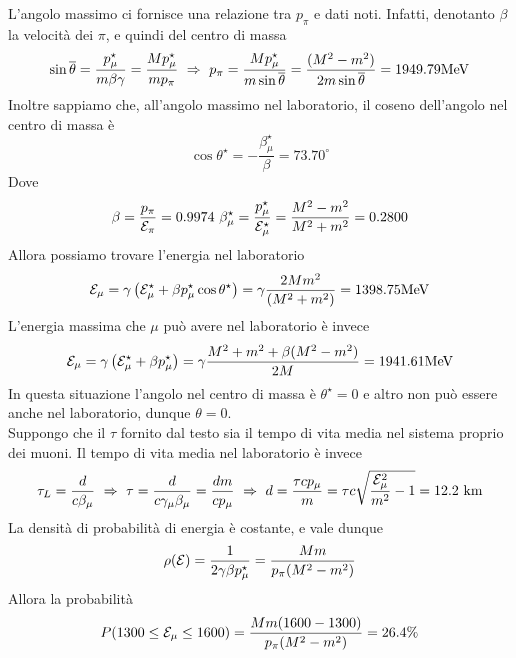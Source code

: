 \documentclass[12pt,twoside,a4]{article}
\begin{document}
\begin{solution}
L'angolo massimo ci fornisce una relazione tra $p_\pi$ e dati noti. Infatti, denotanto $\beta$ la velocità  dei $\pi$, e quindi del centro di massa
$$ \sin\overline{\theta} = \frac{p^\star_\mu}{ m \beta \gamma} = \frac{ M p^\star_\mu}{ m p_\pi}  \  \Rightarrow  \  p_\pi = \frac{ M p^\star_\mu}{ m \sin\overline{\theta}} = 
 \frac{ (M^2 - m^2) }{ 2 m \sin\overline{\theta}} = 1949.79 \mathrm{MeV}$$
Inoltre sappiamo che, all'angolo massimo nel laboratorio, il coseno dell'angolo nel centro di massa è
$$ \cos \theta^\star = - \frac{\beta^\star_\mu}{\beta} = 73.70^\circ$$
Dove
$$ \beta = \frac{p_\pi}{\mathcal{E}_\pi} = 0.9974  \  \beta^\star_\mu =
\frac{p^\star_\mu}{\mathcal{E}^\star_\mu} = \frac{M^2 -m^2}{M^2 + m^2} = 0.2800 $$
Allora possiamo trovare l'energia nel laboratorio
$$ \mathcal{E}_\mu = \gamma \left({ \mathcal{E}_\mu^\star  + \beta p^\star_\mu \cos \theta^\star }\right) = \gamma \frac{2 M m^2}{ (M^2 + m^2)} = 1398.75 \mathrm{MeV}$$
L'energia massima che $\mu$ può avere nel laboratorio è invece
$$\mathcal{E}_\mu = \gamma \left({\mathcal{E}_\mu^\star + \beta p_\mu^\star}\right) = \gamma \frac{M^2 + m^2 + \beta(M^2 -m^2)}{2M} = 1941.61 \mathrm{MeV}$$
In questa situazione l'angolo nel centro di massa è $\theta^\star =0$ e altro non può essere anche nel laboratorio, dunque $\theta = 0$. 
\\
Suppongo che il $\tau$ fornito dal testo sia il tempo di vita media nel sistema proprio dei muoni. Il tempo di vita media nel laboratorio è invece
$$ \tau_L = \frac{d}{c \beta_\mu}  \  \Rightarrow  \  \tau = \frac{d}{c \gamma_\mu  \beta_\mu} = \frac{d  m}{c p_\mu}  \  \Rightarrow  \  d  = \frac{\tau c p_\mu}{m} = \tau c \sqrt{\frac{\mathcal{E}_\mu^2}{m^2} - 1} = 12.2 \mbox{ km}
$$
La densità  di probabilità  di energia è costante, e vale dunque
$$ \rho (\mathcal{E}) = \frac{1}{2  \gamma \beta p^\star_\mu} = \frac{Mm}{ p_\pi (M^2 - m^2) }$$
Allora la probabilità 
$$ P (1300 \leq \mathcal{E}_\mu \leq 1600) = \frac{Mm(1600-1300)}{ p_\pi (M^2 - m^2) } = 26.4 \% $$
\end{solution}
\end{document}
